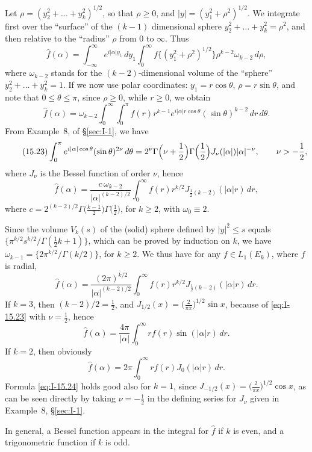Let $\rho=(y_2^{2}+\ldots+y_k^{2})^{1/2}$, so that $\rho\ge 0$, and $|y|=(y_1^{2}+\rho^{2})^{1/2}$. We integrate first over the ``surface'' of the $(k-1)$ dimensional sphere $y_2^{2}+\ldots+y_k^{2}=\rho^{2}$, and then relative to the ``radius'' $\rho$ from $0$ to $\infty$. Thus
\begin{equation*}
\widehat f(\alpha)=\int_{-\infty}^{\infty}e^{i|\alpha|y_1}\,dy_1\int_{0}^{\infty}f\bigl\{(y_1^{2}+\rho^{2})^{1/2}\bigr\}\rho^{k-2}\omega_{k-2}\,d\rho,
\end{equation*}
where $\omega_{k-2}$ stands for the $(k-2)$-dimensional volume of the ``sphere'' $y_2^{2}+\ldots+y_k^{2}=1$. If we now use polar coordinates: $y_1=r\cos\theta$, $\rho=r\sin\theta$, and note that $0\le\theta\le\pi$, since $\rho\ge 0$, while $r\ge 0$, we obtain
\begin{equation*}
\widehat f(\alpha)=\omega_{k-2}\int_{0}^{\infty}\int_{0}^{\pi}f(r)r^{k-1}e^{i|\alpha|r\cos\theta}(\sin\theta)^{k-2}\,dr\,d\theta.
\end{equation*}
From Example~8, of \S\ref{sec:I-1}, we have
\begin{equation}\label{eq:I-15.23}\tag{15.23}
\int_{0}^{\pi}e^{i|\alpha|\cos\theta}(\sin\theta)^{2\nu}\,d\theta
=2^{\nu}\Gamma\Bigl(\nu+\frac12\Bigr)\Gamma\Bigl(\frac12\Bigr)J_{\nu}(|\alpha|)|\alpha|^{-\nu},\qquad\nu>-\frac12,
\end{equation}
where $J_{\nu}$ is the Bessel function of order $\nu$, hence
\begin{equation*}
\widehat f(\alpha)=\frac{c\,\omega_{k-2}}{|\alpha|^{(k-2)/2}}\int_{0}^{\infty}f(r)r^{k/2}J_{\frac12(k-2)}(|\alpha|r)\,dr,
\end{equation*}
where $c=2^{(k-2)/2}\Gamma\bigl(\frac{k-1}{2}\bigr)\Gamma\bigl(\frac12\bigr)$, for $k\ge 2$, with $\omega_0\equiv 2$.

Since the volume $V_k(s)$ of the (solid) sphere defined by $|y|^{2}\le s$ equals $\bigl\{\pi^{k/2}s^{k/2}/\Gamma(\frac12 k+1)\bigr\}$, which can be proved by induction on $k$, we have $\omega_{k-1}=\bigl\{2\pi^{k/2}/\Gamma(k/2)\bigr\}$, for $k\ge 2$. We thus have for any $f\in L_1(E_k)$, where $f$ is radial,
\begin{equation}\label{eq:I-15.24}\tag{15.24}
\widehat f(\alpha)=\frac{(2\pi)^{k/2}}{|\alpha|^{(k-2)/2}}\int_{0}^{\infty}f(r)r^{k/2}J_{\frac12(k-2)}(|\alpha|r)\,dr.
\end{equation}
If $k=3$, then $(k-2)/2=\frac12$, and $J_{1/2}(x)=\bigl(\frac{2}{\pi x}\bigr)^{1/2}\sin x$, because of \eqref{eq:I-15.23} with $\nu=\frac12$, hence
\begin{equation*}
\widehat f(\alpha)=\frac{4\pi}{|\alpha|}\int_{0}^{\infty}r f(r)\sin(|\alpha|r)\,dr.
\end{equation*}
If $k=2$, then obviously
\begin{equation*}
\widehat f(\alpha)=2\pi\int_{0}^{\infty}r f(r)J_0(|\alpha|r)\,dr.
\end{equation*}
Formula \eqref{eq:I-15.24} holds good also for $k=1$, since $J_{-1/2}(x)=\bigl(\frac{2}{\pi x}\bigr)^{1/2}\cos x$, as can be seen directly by taking $\nu=-\frac12$ in the defining series for $J_{\nu}$ given in Example~8, \S\ref{sec:I-1}.

In general, a Bessel function appears in the integral for $\widehat f$ if $k$ is even, and a trigonometric function if $k$ is odd.
